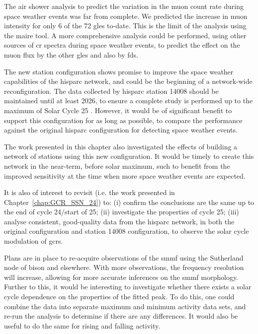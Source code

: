The air shower analysis to predict the variation in the muon count rate during space weather events was far from complete. We predicted the increase in muon intensity for only 6 of the 72 \glspl{gle} to-date. This is the limit of the analysis using the \gls{maire} tool. A more comprehensive analysis could be performed, using other sources of \gls{cr} spectra during space weather events, to predict the effect on the muon flux by the other \glspl{gle} and also by \glspl{fd}.

The new station configuration shows promise to improve the space weather capabilities of the \gls{hisparc} network, and could be the beginning of a network-wide reconfiguration. The data collected by \gls{hisparc} station 14008 should be maintained until at least 2026, to ensure a complete study is performed up to the maximum of Solar Cycle 25 \citep{mcintosh_overlapping_2020, pesnell_lessons_2020}. However, it would be of significant benefit to support this configuration for as long as possible, to compare the performance against the original \gls{hisparc} configuration for detecting space weather events.

The work presented in this chapter also investigated the effects of building a network of stations using this new configuration. It would be timely to create this network in the near-term, before solar maximum, such to benefit from the improved sensitivity at the time when more space weather events are expected.

It is also of interest to revisit \citet{ross_behaviour_2019} (i.e. the work presented in Chapter~\ref{chap:GCR_SSN_24}) to: (i) confirm the conclusions are the same up to the end of cycle 24/start of 25; (ii) investigate the properties of cycle 25; (iii) analyse consistent, good-quality data from the \gls{hisparc} network, in both the original configuration and station 14008 configuration, to observe the solar cycle modulation of \glspl{gcr}.

Plans are in place to re-acquire observations of the \gls{smmf} using the Sutherland node of \gls{bison} and elsewhere. With more observations, the frequency resolution will increase, allowing for more accurate inferences on the \gls{smmf} morphology. Further to this, it would be interesting to investigate whether there exists a solar cycle dependence on the properties of the fitted peak. To do this, one could combine the data into separate maximum and minimum activity data sets, and re-run the analysis to determine if there are any differences. It would also be useful to do the same for rising and falling activity.

